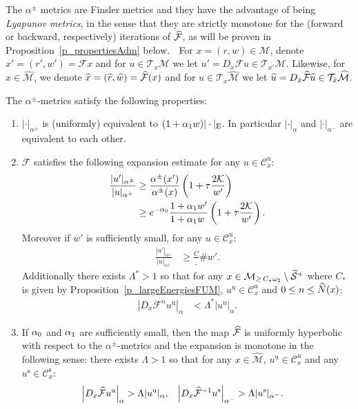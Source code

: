 \documentclass[AHL, Unicode, longabstracts,published]{cedram}
\newcommand{\ct}{r}
\newcommand{\fft}{\tau}
\newcommand{\const}{C_\#}
\newcommand{\inv}{^{-1}}
\newcommand{\unstable}{\text{u}}
\newcommand{\stable}{\text{s}}
\newcommand{\cK}{\mathcal{K}}
\newcommand{\tang}{\mathcal{T}}
\newcommand{\cm}{\mathcal{F}}
\newcommand{\csp}{\mathcal{M}}
\newcommand{\cmp}{\hat\cm}
\newcommand{\cone}{\mathcal{C}}
\newcommand{\cspl}[1]{\csp_{\ge\,#1}}
\newcommand{\cspi}{\widehat{\csp}}
\newcommand{\coneu}{\cone^\unstable}
\newcommand{\cones}{\cone^\stable}
\newcommand{\eum}{_\text{E}}
\newcommand{\singPrivate}{\mathcal{S}}
\newcommand{\singt}[1]{\tilde{\singPrivate}^{#1}}
\newcommand{\law}[1]{\omega_{#1}}
\newcommand{\adm}{_{\alpha^{+}}}
\newcommand{\adms}{_{\alpha^{-}}}
\newcommand{\admPm}{_{\alpha^{\pm}}}
\newcommand{\admNamePm}{\alpha^{\pm}}
\newcommand\admParam[1]{
\ifnum0=#1\relax
\alpha_0
\else
\ifnum1=#1\relax
\alpha_1\fi\fi}
\newcommand{\Np}{\hat N}
\renewcommand{\adm}{_{\alpha}}
\newcommand*{\relabel}{\renewcommand{\labelenumi}{(\theenumi)}}
\newcommand*{\alphenumi}{\renewcommand*{\theenumi}{\alph{enumi}}\relabel}
\let\oldtilde\tilde
\renewcommand*{\tilde}[1]{\mathchoice{\widetilde{#1}}{\widetilde{#1}}{\oldtilde{#1}}{\oldtilde{#1}}}
\let\oldhat\hat
\renewcommand*{\hat}[1]{\mathchoice{\widehat{#1}}{\widehat{#1}}{\oldhat{#1}}{\oldhat{#1}}}
\begin{document}
The $\admNamePm$ metrics are Finsler metrics and they have the advantage of being \emph{Lyapunov metrics}, in the sense that they are strictly monotone for the (forward or backward, respectively) iterations of $\cmp$, as will be proven in Proposition~\ref{p_propertiesAdm} below.  For $x = (\ct,w)\in\csp$, denote $x' = (\ct',w') = \cm x$ and for $u\in\tang_x\csp$ we let $u' = D_{x}\cm u\in\tang_{x'}\csp$. Likewise, for $x\in\cspi$, we denote $\hat x = (\hat\ct,\hat w) = \cmp(x)$ and for $u\in\tang_x\cspi$ we let $\hat u= D_{\hat x}\cmp\hat u\in\tang_{\hat x}\cspi$.

\pagebreak
\begin{prop}\label{p_propertiesAdm}
The $\admNamePm$-metrics satisfy the following properties:
\begin{enumerate}\alphenumi
\item\label{i_admeum}
$|\cdot|\admPm$ is (uniformly) equivalent to $(1+\admParam1 w)|\cdot|\eum$. In particular $|\cdot|\adm$ and $|\cdot|\adms$ are equivalent to each other.
\item\label{i_expansionAdm}
$\cm$ satisfies the following expansion estimate for any $u\in\coneu_x$:
\begin{subequations}\label{e_expansionAdm-two}
\begin{align}
\frac{|u'|\admPm}{|u|\admPm} &\ge \frac{\alpha^{\pm}(x')}{\alpha^\pm(x)}\left(1+\fft\frac{2\cK}{w'}\right)\label{e_expansionAdm-alpha}\\
&\ge e^{-\admParam0}\frac{1+\admParam1 w'}{1+\admParam1 w\phantom'}\left(1+\fft\frac{2\cK}{w'}\right).\label{e_expansionAdm}
\end{align}
\end{subequations}%
Moreover if $w'$ is sufficiently small, for any $u\in\coneu_x$:
\begin{align}\label{e_expansionAdm-II}
\frac{|u'|\admPm}{|u|\admPm} &\ge \frac\const{w'}.
\end{align}
Additionally there exists $\Lambda^{*} > 1$ so that for any $x\in\cspl{C_{*}\law2}\setminus\singt{+}$ where $C_{*}$ is given by Proposition~\ref{p_largeEnergiesFUM}, $u^{\unstable}\in\coneu_x$ and $0\le n\le \Np(x)$:
\begin{align}\label{e_boundedExpansion}
|D_{x}\cm^{n}u^{\unstable} |\adm& < \Lambda^{*}|u^{\unstable}|\adm.
\end{align}
\item\label{i_uniformHyperbolicity}
If $\admParam0$ and $\admParam1$ are sufficiently small, then the map $\cmp$ is uniformly hyperbolic with respect to the $\admNamePm$-metrics and the expansion is monotone in the following sense: there exists $\Lambda>1$ so that for any $x\in\cspi$, $u^{\unstable}\in\coneu_x$ and any $u^{\stable}\in\cones_x$:
\begin{align}\label{e_uniformHyperbolicity}
\left|D_{x}\cmp u^{\unstable}\right|\adm&>\Lambda|u^{\unstable}|\adm, &\left|D_{x}\cmp\inv u^{\stable}\right|\adms&>\Lambda|u^{\stable}|\adms.
\end{align}
\end{enumerate}
\end{prop}
\end{document}

